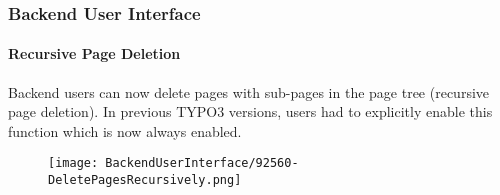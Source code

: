 %

\begin{frame}[fragile]
	\frametitle{Backend User Interface}
	\framesubtitle{Recursive Page Deletion}

	Backend users can now delete pages with sub-pages in the page tree (recursive page deletion).
	In previous TYPO3 versions, users had to explicitly enable this function which is now always enabled.

	\begin{figure}
		\texttt{[image: BackendUserInterface/92560-DeletePagesRecursively.png]}
	\end{figure}

\end{frame}

